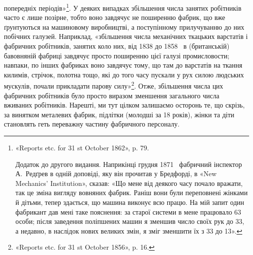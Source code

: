 \parcont{}  %
попередніх періодів»\footnote{
«Reports etc. for 31 st October 1862», p. 79.

Додаток до другого видання. Наприкінці грудня 1871~ фабричний
інспектор А.~Редґрев в одній доповіді, яку він прочитав у Бредфорді, в
«New Mechanics’ Institution», сказав: «Що мене від деякого часу почало
вражати, так це зміна вигляду вовняних фабрик. Раніш вони були переповнені
жінками й дітьми, тепер здається, що машина виконує всю працю.
На мій запит один фабрикант дав мені таке пояснення: за старої системи в
мене працювало 63 особи; після заведення поліпшених машин я зменшив
число своїх рук до 33, а недавно, в наслідок нових великих змін, я зміг
зменшити їх з 33 до 13».
}. У деяких випадках збільшення числа
занятих робітників часто є лише позірне, тобто воно завдячує не
поширенню фабрик, що вже ґрунтуються на машиновому виробництві,
а поступінному прилучуванню до них побічних галузей.
Наприклад, «збільшення числа механічних ткацьких варстатів
і фабричних робітників, занятих коло них, від 1838 до 1858~
в (британській) бавовняній фабриці завдячує просто поширенню
цієї галузі промисловости; навпаки, по інших фабриках воно
завдячує тому, що там до варстатів на ткання килимів, стрічок,
полотна тощо, які до того часу пускали у рух силою людських
мускулів, почали прикладати парову силу»\footnote{
«Reports etc. for 31 st October 1856», p. 16.
}. Отже, збільшення
числа цих фабричних робітників було просто виразом зменшення
загального числа вживаних робітників. Нарешті, ми тут цілком
залишаємо осторонь те, що скрізь, за винятком металевих фабрик,
підлітки (молодші за 18 років), жінки та діти становлять геть
переважну частину фабричного персоналу.

